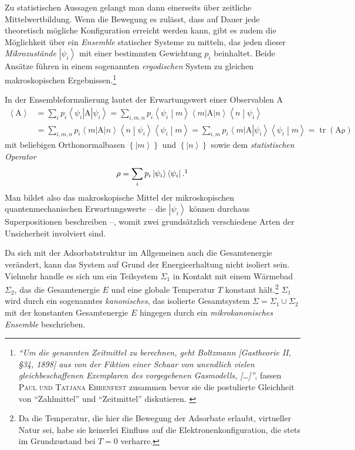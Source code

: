 \documentclass[a4paper, 10pt, twoside, openany]{book} %
\newcommand \bra[1]{\left \langle #1 \right |}
\newcommand \ket[1]{\left | #1 \right \rangle}
\newcommand \bracket[2]{\left \langle #1 \middle | #2 \right \rangle}
\newcommand \braces[1]{\left \lbrace #1 \right \rbrace}
\newcommand \av[1]{\left \langle #1 \right \rangle}
\newcommand \op[1]{\mathrm{#1}}
\begin{document}
Zu statistischen Aussagen gelangt man dann einerseits über zeitliche Mittelwertbildung. Wenn die Bewegung es zulässt, dass auf Dauer jede theoretisch mögliche Konfiguration erreicht werden kann, gibt es zudem die Möglichkeit über ein \emph{Ensemble} statischer Systeme zu mitteln, das jeden dieser \emph{Mikrozustände} $\ket{\psi_i}$ mit einer bestimmten Gewichtung $p_i$ beinhaltet. Beide Ansätze führen in einem sogenannten \emph{ergodischen} System zu gleichen makroskopischen Ergebnissen.\footnote{\emph{"`Um die genannten Zeitmittel zu berechnen, geht \emph{Boltzmann} \emph{[Gastheorie II, \S 34, 1898]} aus von der Fiktion einer Schaar von unendlich vielen gleichbeschaffenen Exemplaren des vorgegebenen Gasmodells, \emph{[\dots]}"'}, fassen \textsc{Paul und Tatjana Ehrenfest} zusammen bevor sie die postulierte Gleichheit von "`Zahlmittel"' und "`Zeitmittel"' diskutieren. \cite[S.~34]{Ehrenfest1}}

In der Ensembleformulierung lautet der Erwartungswert einer Observablen $\op A$
%
\begin{align*}
    \av{\op A} &= \sum_i p_i \bra{\psi_i} \op A \ket{\psi_i} = \sum_{i, m, n} p_i \bracket {\psi_i} m \bra m \op A \ket n \bracket n {\psi_i} \\
    &= \sum_{i, m, n} p_i \bra m \op A \ket n \bracket n {\psi_i} \bracket {\psi_i} m = \sum_{i, m} p_i \bra m \op A \ket{\psi_i} \bracket {\psi_i} m = \operatorname{tr}(\op A \op \rho)
\end{align*}
%
mit beliebigen Orthonormalbasen $\braces{\ket m}$ und $\braces{\ket n}$ sowie dem \emph{statistischen Operator}
%
\begin{align}
    \op \rho = \sum_i p_i \ket{\psi_i} \bra{\psi_i}.\footnotemark
    \label{statistischer Operator}
\end{align}
%
Man bildet also das makroskopische Mittel der mikroskopischen quantenmechanischen Erwartungswerte -- die $\ket{\psi_i}$ können durchaus Superpositionen beschreiben --, womit zwei grundsätzlich verschiedene Arten der Unsicherheit involviert sind.

Da sich mit der Adsorbatstruktur im Allgemeinen auch die Gesamtenergie verändert, kann das System auf Grund der Energieerhaltung nicht isoliert sein. Vielmehr handle es sich um ein Teilsystem $\Sigma_1$ in Kontakt mit einem Wärmebad $\Sigma_2$, das die Gesamtenergie $E$ und eine globale Temperatur $T$ konstant hält.\footnote{Da die Temperatur, die hier die Bewegung der Adsorbate erlaubt, virtueller Natur sei, habe sie keinerlei Einfluss auf die Elektronenkonfiguration, die stets im Grundzustand bei $T = 0$ verharre.} $\Sigma_1$ wird durch ein sogenanntes \emph{kanonisches}, das isolierte Gesamtsystem $\Sigma = \Sigma_1 \cup \Sigma_2$ mit der konstanten Gesamtenergie $E$ hingegen durch ein \emph{mikrokanonisches Ensemble} beschrieben.
\end{document}
